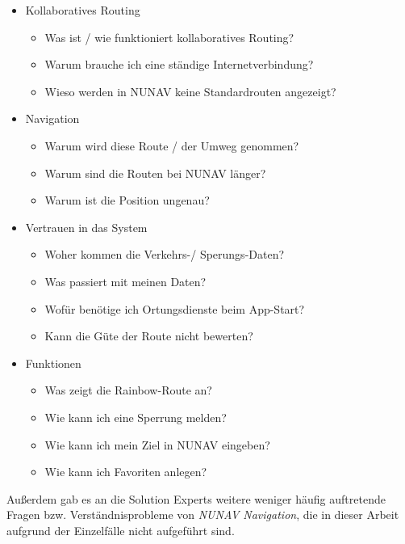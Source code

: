 \begin{itemize}
    \item Kollaboratives Routing
        \begin{itemize}
            \item Was ist / wie funktioniert kollaboratives Routing?
            \item Warum brauche ich eine ständige Internetverbindung?
            \item Wieso werden in NUNAV keine Standardrouten angezeigt?
        \end{itemize}
    \item Navigation
        \begin{itemize}
            \item Warum wird diese Route / der Umweg genommen?
            \item Warum sind die Routen bei NUNAV länger?
            \item Warum ist die Position ungenau?
        \end{itemize}
    \item Vertrauen in das System
        \begin{itemize}
            \item Woher kommen die Verkehrs-/ Sperungs-Daten?
            \item Was passiert mit meinen Daten?
            \item Wofür benötige ich Ortungsdienste beim App-Start?
            \item Kann die Güte der Route nicht bewerten?
        \end{itemize}
    \item Funktionen
        \begin{itemize}
            \item Was zeigt die Rainbow-Route an?
            \item Wie kann ich eine Sperrung melden?
            \item Wie kann ich mein Ziel in NUNAV eingeben?
            \item Wie kann ich Favoriten anlegen?
        \end{itemize}
\end{itemize}

Außerdem gab es an die \glqq Solution Experts\grqq{} weitere weniger häufig auftretende Fragen bzw. Verständnisprobleme von \textit{NUNAV Navigation}, die in dieser Arbeit aufgrund der Einzelfälle nicht aufgeführt sind.

\bigskip

